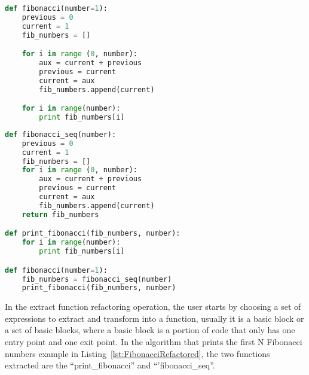 



\begin{lstlisting}[frame=single, caption=Fibonacci function first implementation, label={lst:Fibonacci}, language=Python]
def fibonacci(number=1):
	previous = 0
	current = 1
	fib_numbers = []

	for i in range (0, number):
		aux = current + previous
		previous = current
		current = aux
		fib_numbers.append(current)

	for i in range(number):
		print fib_numbers[i]
\end{lstlisting}


\begin{lstlisting}[frame=single, caption=Fibonacci function after using extract function, label={lst:FibonacciRefactored}, language=Python]
def fibonacci_seq(number):
	previous = 0
	current = 1
	fib_numbers = []
	for i in range (0, number):
		aux = current + previous
		previous = current
		current = aux
		fib_numbers.append(current)
	return fib_numbers

def print_fibonacci(fib_numbers, number):
	for i in range(number):
		print fib_numbers[i]

def fibonacci(number=1):
	fib_numbers = fibonacci_seq(number)
	print_fibonacci(fib_numbers, number)
\end{lstlisting}


In the extract function refactoring operation, the user starts by choosing a set of expressions to extract and transform into a function, usually it is a  basic block or a set of basic blocks, where a basic block is a portion of code that only has one entry point and one exit point.
In the algorithm that prints the first N Fibonacci numbers example in Listing~\ref{lst:FibonacciRefactored}, the two functions extracted are the ``print\_fibonacci'' and ``'fibonacci\_seq''.

